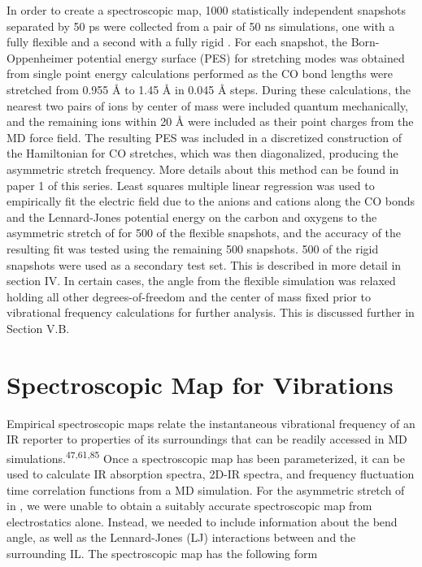 \documentclass[]{article}
\begin{document}
In order to create a spectroscopic map, 1000 statistically independent snapshots separated by 50 ps were collected from a pair of 50 ns simulations, one with a fully flexible  and a second with a fully rigid . For each snapshot, the Born-Oppenheimer potential energy surface (PES) for  stretching modes was obtained from single point energy calculations performed as the CO bond lengths were stretched from 0.955 Å to 1.45 Å in 0.045 Å steps. During these calculations, the nearest two pairs of ions by center of mass were included quantum mechanically, and the remaining ions within 20 Å were included as their point charges from the MD force field. The resulting PES was included in a discretized construction of the Hamiltonian for CO stretches, which was then diagonalized, producing the asymmetric stretch frequency. More details about this method can be found in paper 1 of this series. Least squares multiple linear regression was used to empirically fit the electric field due to the anions and cations along the CO bonds and the Lennard-Jones potential energy on the  carbon and oxygens to the asymmetric stretch of  for 500 of the flexible snapshots, and the accuracy of the resulting fit was tested using the remaining 500 snapshots. 500 of the rigid snapshots were used as a secondary test set. This is described in more detail in section IV.  In certain cases, the  angle from the flexible simulation was relaxed holding all other degrees-of-freedom and the  center of mass fixed prior to vibrational frequency calculations for further analysis. This is discussed further in Section V.B.

\section{Spectroscopic Map for  Vibrations}
\label{paper_03:sec:III}

Empirical spectroscopic maps relate the instantaneous vibrational frequency of an IR reporter to properties of its surroundings that can be readily accessed in MD simulations.\textsuperscript{47,61,85} Once a spectroscopic map has been parameterized, it can be used to calculate IR absorption spectra, 2D-IR spectra, and frequency fluctuation time correlation functions from a MD simulation. For the asymmetric stretch of  in \ce{[C4C1im][PF6]}, we were unable to obtain a suitably accurate spectroscopic map from electrostatics alone. Instead, we needed to include information about the  bend angle, as well as the Lennard-Jones (LJ) interactions between  and the surrounding IL. The spectroscopic map has the following form
\end{document}
